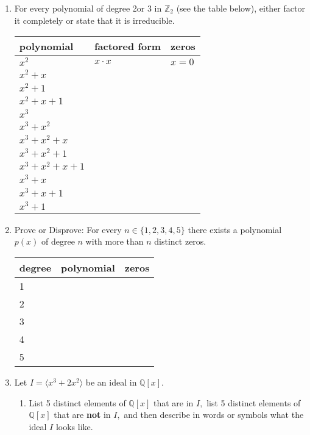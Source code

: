 \documentclass[12pt]{article}
\renewcommand{\emph}[1]{\textsf{\textbf{#1}}}
\newcommand{\bbZ}{\mathbb{Z}}
\newcommand{\bbQ}{\mathbb{Q}}
\begin{document}
\begin{enumerate}
\item For every polynomial of degree 2or 3 in $\bbZ_2$ (see the table below), either factor it completely or state that it is irreducible. \\
\begin{center}
\begin{tabular}{lll}
polynomial & factored form&zeros\\
\hline \hline
$x^2$&$x \cdot x$&$x=0$\\
$x^2+x$&&\\
$x^2+1$&&\\
$x^2+x+1$&&\\
$x^3$&&\\
$x^3+x^2$&&\\
$x^3+x^2+x$&&\\
$x^3+x^2+1$&&\\
$ x^3+x^2+x+1$&&\\
$ x^3+x$&&\\
$x^3+x+1$&&\\
$x^3+1$&&\\
\end{tabular}
\end{center}

\item Prove or Disprove: For every $n \in \{1,2,3,4,5\}$ there exists a polynomial $p(x)$ of degree $n$  with more than $n$ distinct zeros.\\

\begin{center}
\begin{tabular}{lll}
degree & polynomial&zeros\\
\hline \hline
1&&\\
2&&\\
3&&\\
4&&\\
5&&\\
\end{tabular}
\end{center}

\item Let $I=\langle x^3+2x^2 \rangle$ be an ideal in $\bbQ[x].$\\
	\begin{enumerate}
	\item List 5 distinct elements of $\bbQ[x]$ that are in $I,$ list 5 distinct elements of $\bbQ[x]$ that are \emph{not} in $I,$ and then describe in words or symbols what the ideal $I$ looks like. \\
	

\end{enumerate}
\end{enumerate}
\end{document}
